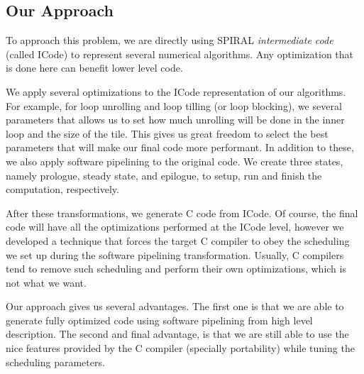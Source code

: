 \documentclass[12pt]{article}
\begin{document}
\subsection{Our Approach}

To approach this problem, we are directly using SPIRAL \emph{intermediate code} (called ICode)
to represent several numerical algorithms. Any optimization that is done here can benefit
lower level code.

We apply several optimizations to the ICode representation of our algorithms. For example,
for loop unrolling and loop tilling (or loop blocking), we several parameters that allows
us to set how much unrolling will be done in the inner loop and the size of the tile.
This gives us great freedom to select the best parameters that will make our final code more
performant. In addition to these, we also apply software pipelining to the original code.
We create three states, namely prologue, steady state, and epilogue, to setup, run and finish
the computation, respectively.

After these transformations, we generate C code from ICode. Of course, the final code will
have all the optimizations performed at the ICode level, however we developed a technique that
forces the target C compiler to obey the scheduling we set up during the software pipelining
transformation. Usually, C compilers tend to remove such scheduling and perform their own optimizations,
which is not what we want.

Our approach gives us several advantages. The first one is that we are able to generate fully optimized
code using software pipelining from high level description. The second and final advantage, is that
we are still able to use the nice features provided by the C compiler (specially portability)
while tuning the scheduling parameters. 


\begin{comment}
+( ) Work directly in the SPIRAL intermediate code. Any optimization that is done
  here can benefit any operation expressed at a higher level of abstraction.

+( ) We use Software Pipelining in addition to loop unrolling and other
  optimizations that we can fine tune.

+( ) We generate the target code in C and use a quality production compiler.

+( ) But we instrument our code in such a way that we can force a particular
  schedule on our code.

+( ) Thus we get all of the benefits of APGS and the ability to even tune
  schedules, but we can still take advantage of the compiler for dealing with
  mapping our implementation to assembly (reg alloc and such).
\end{comment}
\end{document}
